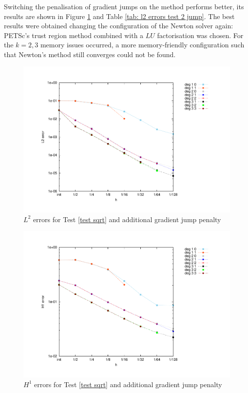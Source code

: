 Switching the penalisation of gradient jumps on the method performs better, its results are shown in Figure \ref{fig: l2 errors test 2 jump} and Table \ref{tab: l2 errors test 2 jump}. The best results were obtained changing the configuration of the Newton solver again: PETSc's trust region method combined with a $LU$ factorisation was chosen. For the $k=2,3$ memory issues occurred, a more memory-friendly configuration such that Newton's method still converges could not be found. %

\begin{figure}[H]
	\centering
	\includegraphics[scale =0.4]{plots/MA2_Neilan_GradJump_l2.pdf}
	\caption{$L^2$ errors for Test \ref{test sqrt}  and additional gradient jump penalty}
	\label{fig: l2 errors test 2 jump}
\end{figure}
\begin{figure}[H]
	\centering
	\includegraphics[scale =0.4]{plots/MA2_Neilan_GradJump_h1.pdf}
	\caption{$H^1$ errors for Test \ref{test sqrt}  and additional gradient jump penalty}
	\label{fig: h1 errors test 2 jump}
\end{figure}
